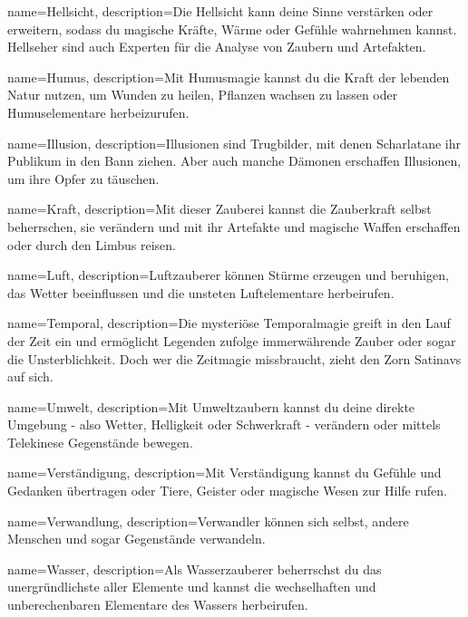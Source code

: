 {
    name={Hellsicht},
    description={Die Hellsicht kann deine Sinne verstärken oder erweitern, sodass du magische Kräfte, Wärme oder Gefühle wahrnehmen kannst. Hellseher sind auch Experten für die Analyse von Zaubern und Artefakten. }
}


{
    name={Humus},
    description={Mit Humusmagie kannst du die Kraft der lebenden Natur nutzen, um Wunden zu heilen, Pflanzen wachsen zu lassen oder Humuselementare herbeizurufen. }
}


{
    name={Illusion},
    description={Illusionen sind Trugbilder, mit denen Scharlatane ihr Publikum in den Bann ziehen. Aber auch manche Dämonen erschaffen Illusionen, um ihre Opfer zu täuschen. }
}


{
    name={Kraft},
    description={Mit dieser Zauberei kannst die Zauberkraft selbst beherrschen, sie verändern und mit ihr Artefakte und magische Waffen erschaffen oder durch den Limbus reisen.}
}


{
    name={Luft},
    description={Luftzauberer können Stürme erzeugen und beruhigen, das Wetter beeinflussen und die unsteten Luftelementare herbeirufen. }
}


{
    name={Temporal},
    description={Die mysteriöse Temporalmagie greift in den Lauf der Zeit ein und ermöglicht Legenden zufolge immerwährende Zauber oder sogar die Unsterblichkeit. Doch wer die Zeitmagie missbraucht, zieht den Zorn Satinavs auf sich.}
}


{
    name={Umwelt},
    description={Mit Umweltzaubern kannst du deine direkte Umgebung - also Wetter, Helligkeit oder Schwerkraft - verändern oder mittels Telekinese Gegenstände bewegen. }
}


{
    name={Verständigung},
    description={Mit Verständigung kannst du Gefühle und Gedanken übertragen oder Tiere, Geister oder magische Wesen zur Hilfe rufen. }
}


{
    name={Verwandlung},
    description={Verwandler können sich selbst, andere Menschen und sogar Gegenstände verwandeln. }
}


{
    name={Wasser},
    description={Als Wasserzauberer beherrschst du das unergründlichste aller Elemente und kannst die wechselhaften und unberechenbaren Elementare des Wassers herbeirufen.}
}


